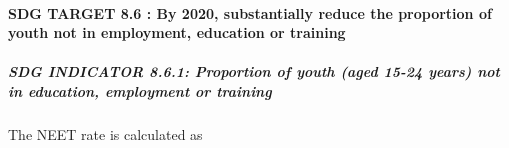 \documentclass[
]{article}
\begin{document}
\paragraph{SDG TARGET 8.6 : By 2020, substantially reduce the proportion
of youth not in employment, education or
training}\label{sdg-target-8.6-by-2020-substantially-reduce-the-proportion-of-youth-not-in-employment-education-or-training}

\subparagraph{\texorpdfstring{\textbf{SDG INDICATOR 8.6.1: Proportion of
youth (aged 15-24 years) not in education, employment or
training}}{SDG INDICATOR 8.6.1: Proportion of youth (aged 15-24 years) not in education, employment or training}}\label{sdg-indicator-8.6.1-proportion-of-youth-aged-15-24-years-not-in-education-employment-or-training}

The NEET rate is calculated as
\end{document}
